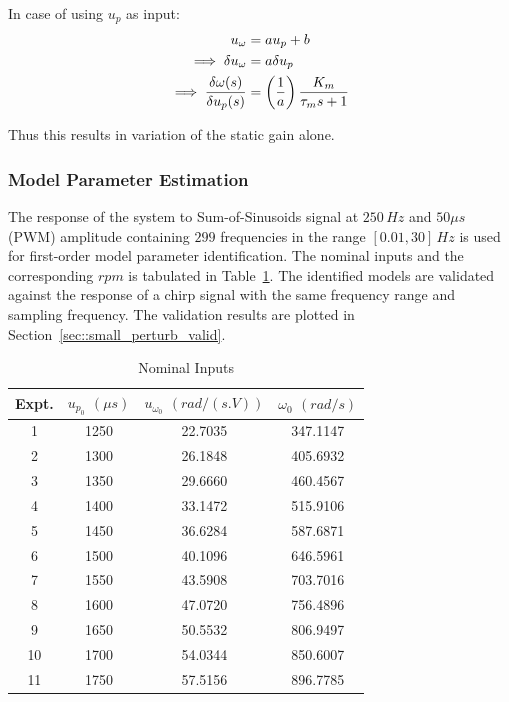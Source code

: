 In case of using $u_p$ as input:
\begin{align*}
    u_\omega &= a u_p + b\\
    \implies \delta u_\omega &= a \delta u_p\\
    \implies \frac{\delta \omega(s)}{\delta u_p(s)} &= \left( \frac{1}{a} \right)\frac{K_m}{\tau_m s + 1}
\end{align*}

Thus this results in variation of the static gain alone.


\subsubsection{Model Parameter Estimation}
The response of the system to Sum-of-Sinusoids signal at $250 \, Hz$ and $50 \mu s$ (PWM) amplitude containing $299$ frequencies in the range $[0.01, 30]\,Hz$ is used for first-order model parameter identification. The nominal inputs and the corresponding $rpm$ is tabulated in Table~\ref{tab::nom_in}. The identified models are validated against the response of a chirp signal with the same frequency range and sampling frequency. The validation results are plotted in Section~\ref{sec::small_perturb_valid}.

\begin{table}[H]
    \centering
    \begin{tabular}{c c c c}
        \hline \hline
        Expt. & $u_{p_0}$ $(\mu s)$& $u_{\omega_0}$ $(rad/(s.V))$ & $\omega_0$ $(rad/s)$ \\ \hline \hline
            1 & 1250      &  22.7035       &  347.1147   \\
            2 & 1300      &  26.1848       &  405.6932   \\
            3 & 1350      &  29.6660       &  460.4567   \\
            4 & 1400      &  33.1472       &  515.9106   \\
            5 & 1450      &  36.6284       &  587.6871   \\
            6 & 1500      &  40.1096       &  646.5961   \\
            7 & 1550      &  43.5908       &  703.7016   \\
            8 & 1600      &  47.0720       &  756.4896   \\
            9 & 1650      &  50.5532       &  806.9497   \\
           10 & 1700      &  54.0344       &  850.6007   \\
           11 & 1750      &  57.5156       &  896.7785   \\
           \hline \hline
    \end{tabular}
    \caption{Nominal Inputs}
    \label{tab::nom_in}
\end{table}


